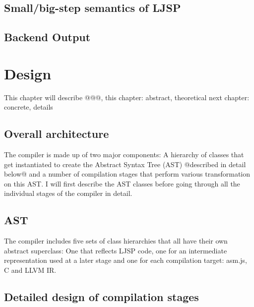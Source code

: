 \documentclass[11pt]{report}
\begin{document}
\section{Small/big-step semantics of LJSP}
\section{Backend Output}

\chapter{Design}
This chapter will describe @@@, this chapter: abstract, theoretical next chapter: concrete, details
\section{Overall architecture}
The compiler is made up of two major components: A hierarchy of classes that get instantiated to create the Abstract Syntax Tree (AST) @described in detail below@ and a number of compilation stages that perform various transformation on this AST. I will first describe the AST classes before going through all the individual stages of the compiler in detail.
\section{AST}
The compiler includes five sets of class hierarchies that all have their own abstract superclass: One that reflects LJSP code, one for an intermediate representation used at a later stage and one for each compilation target: asm.js, C and LLVM IR.
\section{Detailed design of compilation stages}
\end{document}
